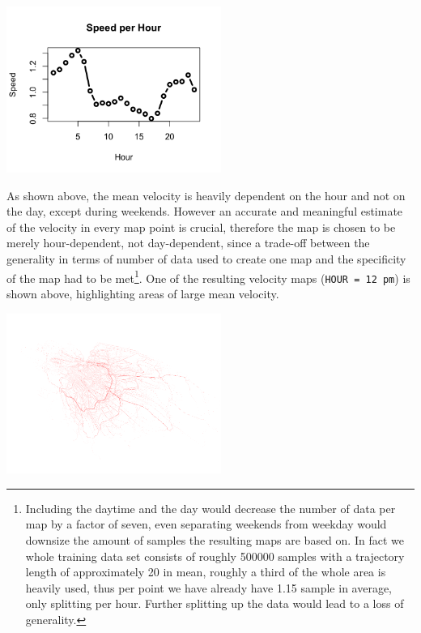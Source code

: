 \documentclass{article}
\newenvironment{Figure}
{\par\medskip\noindent\minipage{\linewidth}}
{\endminipage\par\medskip}
\begin{document}
\begin{multicols}{2}
\begin{Figure}
\begin{center}
\includegraphics[width=7cm]{speed_per_hour.png}
\end{center}
\label{fig:speed_hour}
\end{Figure}

As shown above, the mean velocity is heavily dependent on the hour and not on the day, except during weekends. However an accurate and meaningful estimate of the velocity in every map point is crucial, therefore the map is chosen to be merely hour-dependent, not day-dependent, since a trade-off between the generality in terms of number of data used to create one map and the specificity of the map had to be met\footnote{Including the daytime and the day would decrease the number of data per map by a factor of seven, even separating weekends from weekday would downsize the amount of samples the resulting maps are based on. In fact we whole training data set consists of roughly 500000 samples with a trajectory length of approximately 20 in mean, roughly a third of the whole area is heavily used, thus per point we have already have 1.15 sample in average, only splitting per hour. Further splitting up the data would lead to a loss of generality.}. One of the resulting velocity maps (\texttt{HOUR = 12 pm}) is shown above, highlighting areas of large mean velocity. 

\begin{Figure}
\begin{center}
\includegraphics[width=7cm]{velocity_map.png}
\end{center}
\label{fig:velocity_map}
\end{Figure}


\end{multicols}
\end{document}
